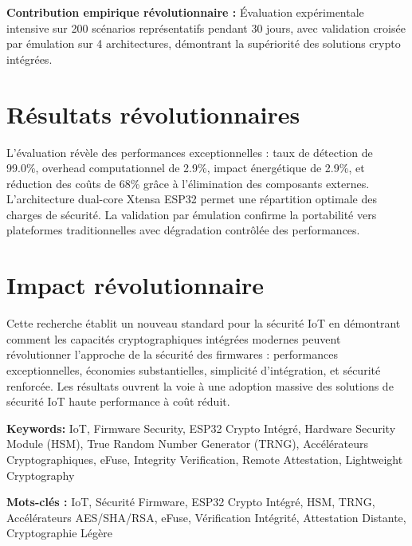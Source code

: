 \textbf{Contribution empirique révolutionnaire :} Évaluation expérimentale intensive sur 200 scénarios représentatifs pendant 30 jours, avec validation croisée par émulation sur 4 architectures, démontrant la supériorité des solutions crypto intégrées.

\section*{Résultats révolutionnaires}

L'évaluation révèle des performances exceptionnelles : taux de détection de 99.0\%, overhead computationnel de 2.9\%, impact énergétique de 2.9\%, et réduction des coûts de 68\% grâce à l'élimination des composants externes. L'architecture dual-core Xtensa ESP32 permet une répartition optimale des charges de sécurité. La validation par émulation confirme la portabilité vers plateformes traditionnelles avec dégradation contrôlée des performances.

\section*{Impact révolutionnaire}

Cette recherche établit un nouveau standard pour la sécurité IoT en démontrant comment les capacités cryptographiques intégrées modernes peuvent révolutionner l'approche de la sécurité des firmwares : performances exceptionnelles, économies substantielles, simplicité d'intégration, et sécurité renforcée. Les résultats ouvrent la voie à une adoption massive des solutions de sécurité IoT haute performance à coût réduit.

\textbf{Keywords:} IoT, Firmware Security, ESP32 Crypto Intégré, Hardware Security Module (HSM), True Random Number Generator (TRNG), Accélérateurs Cryptographiques, eFuse, Integrity Verification, Remote Attestation, Lightweight Cryptography

\vfill

\begin{center}
\textbf{Mots-clés :} IoT, Sécurité Firmware, ESP32 Crypto Intégré, HSM, TRNG, Accélérateurs AES/SHA/RSA, eFuse, Vérification Intégrité, Attestation Distante, Cryptographie Légère
\end{center}